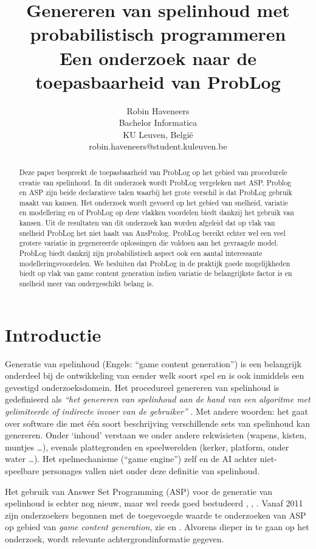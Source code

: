 \documentclass{article}
\title{Genereren van spelinhoud met probabilistisch programmeren \\ \Large{Een onderzoek naar de toepasbaarheid van ProbLog}}
\author{Robin Haveneers \\
Bachelor Informatica\\
KU Leuven, Belgi\"e \\
robin.haveneers@student.kuleuven.be}
\begin{document}
\maketitle

\begin{abstract}
Deze paper bespreekt de toepasbaarheid van ProbLog op het gebied van procedurele creatie van spelinhoud. In dit onderzoek wordt ProbLog vergeleken met ASP. Problog en ASP zijn beide declaratieve talen waarbij het grote verschil is dat ProbLog gebruik maakt van kansen. Het onderzoek wordt gevoerd op het gebied van snelheid, variatie en modellering en of ProbLog op deze vlakken voordelen biedt dankzij het gebruik van kansen. Uit de resultaten van dit onderzoek kan worden afgeleid dat op vlak van snelheid ProbLog het niet haalt van AnsProlog. ProbLog bereikt echter wel een veel grotere variatie in gegenereerde oplossingen die voldoen aan het gevraagde model. ProbLog biedt dankzij zijn probabilistisch aspect ook een aantal interessante modelleringsvoordelen. We besluiten dat ProbLog in de praktijk goede mogelijkheden biedt op vlak van game content generation indien variatie de belangrijkste factor is en snelheid meer van ondergeschikt belang is.
\end{abstract}

\section{Introductie}
Generatie van spelinhoud (Engels: ``game content generation'') is een belangrijk onderdeel bij de ontwikkeling van eender welk soort spel en is ook inmiddels een gevestigd onderzoeksdomein. Het procedureel genereren van spelinhoud is gedefinieerd als \textit{``het genereren van spelinhoud aan de hand van een algoritme met gelimiteerde of indirecte invoer van de gebruiker''} \cite{togelius2015introduction}. Met andere woorden: het gaat over software die met \'e\'en soort beschrijving verschillende sets van spelinhoud kan genereren.
Onder `inhoud' verstaan we onder andere rekwisieten (wapens, kisten, muntjes \dots), evenals plattegronden en speelwerelden (kerker, platform, onder water \dots). Het spelmechanisme (``game engine'') zelf en de AI achter niet-speelbare personages vallen niet onder deze definitie van spelinhoud.
	
Het gebruik van Answer Set Programming (ASP) voor de generatie van spelinhoud is echter nog nieuw, maar wel reeds goed bestudeerd \cite{togelius2015chapter8}, \cite{togelius_guest}, \cite{journals/tciaig/SmithWM11}. Vanaf 2011 zijn onderzoekers begonnen met de toegevoegde waarde te onderzoeken van ASP op gebied van \textit{game content generation}, zie \cite{yannakakis} en \cite{smith}. 
Alvorens dieper in te gaan op het onderzoek, wordt relevante achtergrondinformatie gegeven.
		
\end{document}
